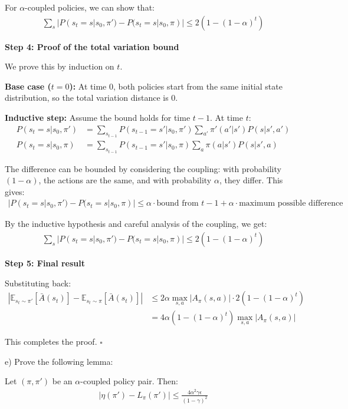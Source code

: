For $\alpha$-coupled policies, we can show that:
\begin{align}
\sum_{s} |P(s_t = s | s_0, \pi') - P(s_t = s | s_0, \pi)| \le 2(1-(1-\alpha)^t)
\end{align}

\textbf{Step 4: Proof of the total variation bound}

We prove this by induction on $t$.

\textbf{Base case ($t = 0$):} At time 0, both policies start from the same initial state distribution, so the total variation distance is 0.

\textbf{Inductive step:} Assume the bound holds for time $t-1$. At time $t$:
\begin{align}
P(s_t = s | s_0, \pi') &= \sum_{s_{t-1}} P(s_{t-1} = s' | s_0, \pi') \sum_{a'} \pi'(a'|s') P(s|s',a') \\
P(s_t = s | s_0, \pi) &= \sum_{s_{t-1}} P(s_{t-1} = s' | s_0, \pi) \sum_{a} \pi(a|s') P(s|s',a)
\end{align}

The difference can be bounded by considering the coupling: with probability $(1-\alpha)$, the actions are the same, and with probability $\alpha$, they differ. This gives:
\begin{align}
|P(s_t = s | s_0, \pi') - P(s_t = s | s_0, \pi)| \le \alpha \cdot \text{bound from } t-1 + \alpha \cdot \text{maximum possible difference}
\end{align}

By the inductive hypothesis and careful analysis of the coupling, we get:
\begin{align}
\sum_{s} |P(s_t = s | s_0, \pi') - P(s_t = s | s_0, \pi)| \le 2(1-(1-\alpha)^t)
\end{align}

\textbf{Step 5: Final result}

Substituting back:
\begin{align}
|\mathbb{E}_{s_t \sim \pi'}[\bar{A}(s_t)] - \mathbb{E}_{s_t \sim \pi}[\bar{A}(s_t)]| &\le 2\alpha \max_{s, a}|A_{\pi}(s,a)| \cdot 2(1-(1-\alpha)^t) \\
&= 4\alpha(1-(1-\alpha)^t)\max_{s, a}|A_\pi(s, a)|
\end{align}

This completes the proof. $\square$

e) Prove the following lemma:

\begin{lemma}
    Let $(\pi, \pi')$ be an $\alpha$-coupled policy pair. Then:
    \begin{align*}
        |\eta(\pi')-L_{\pi}(\pi')| \le \frac{4\alpha^2\gamma\epsilon}{(1-\gamma)^2}
    \end{align*}
\end{lemma}

